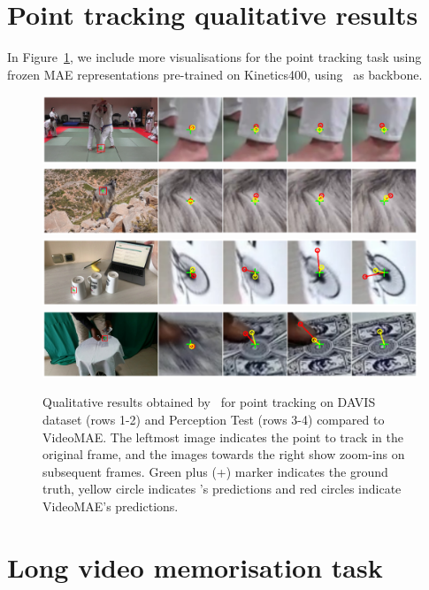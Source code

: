 \section{Point tracking qualitative results}

In Figure~\ref{fig:supmattracking}, we include more visualisations for the point tracking task using frozen MAE representations pre-trained on Kinetics400, using \ssm\ as backbone.  

 \begin{figure}[h]
  \centering
    \includegraphics[width=\linewidth]{img/leg.png}
    \includegraphics[width=\linewidth]{img/goat.png}
    \includegraphics[width=\linewidth]{img/ptbike.png}
    \includegraphics[width=\linewidth]{img/ptcard.png}
    
  \caption{Qualitative results obtained by \ssm\ for point tracking on DAVIS dataset (rows 1-2) and Perception Test (rows 3-4) compared to VideoMAE. The leftmost image indicates the point to track in the original frame, and the images towards the right show zoom-ins on subsequent frames. Green plus (+) marker indicates the ground truth, yellow circle indicates \ssm's predictions and red circles indicate VideoMAE's predictions.}
  \label{fig:supmattracking}
\end{figure}

\section{Long video memorisation task}

